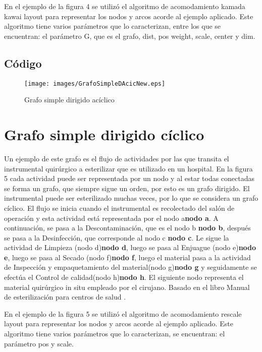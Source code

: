 \documentclass{article}
\begin{document}
En el ejemplo de la figura 4 se utilizó el algoritmo de acomodamiento kamada kawai layout para representar los nodos y arcos acorde al ejemplo aplicado. Este algoritmo tiene varios parámetros que lo caracterizan, entre los que se encuentran: el parámetro G, que es el grafo, dist, pos weight, scale, center y dim. 


\subsection{Código}



\begin{figure}[H]
\centering
\texttt{[image: images/GrafoSimpleDAcicNew.eps]}
\caption{Grafo simple dirigido acíclico}
\end{figure}

\section{Grafo simple dirigido cíclico}

Un ejemplo de este grafo es el flujo de actividades por las que transita el instrumental quirúrgico a esterilizar que es utilizado en un hospital. En la figura 5 cada actividad puede ser representada por un nodo y al estar todas conectadas se forma un grafo, que siempre sigue un orden, por esto es un grafo dirigido. El instrumental puede ser esterilizado muchas veces, por lo que se considera un grafo cíclico. El flujo se inicia cuando el instrumental es recolectado del salón de operación y esta actividad está representada por el nodo a\textbf{nodo a}. A continuación, se pasa a la Descontaminación, que es el nodo b \textbf{nodo b}, después se pasa a la Desinfección, que corresponde al nodo c \textbf{nodo c}. Le sigue la actividad de Limpieza (nodo d)\textbf{nodo d}, luego se pasa al Enjuague (nodo e)\textbf{nodo e}, luego se pasa al Secado (nodo f)\textbf{nodo f}, luego el material pasa a la actividad de Inspección y empaquetamiento del material(nodo g)\textbf{nodo g} y seguidamente se efectúa el  Control de calidad(nodo h)\textbf{nodo h}. El siguiente nodo representa el material quirúrgico in situ empleado por el cirujano. Basado en el libro Manual de esterilización para centros de salud \cite{silviacosta}. 

En el ejemplo de la figura 5 se utilizó el algoritmo de acomodamiento rescale layout para representar los nodos y arcos acorde al ejemplo aplicado. Este algoritmo tiene varios parámetros que lo caracterizan, se encuentran: el parámetro pos y scale. 
\end{document}
